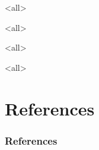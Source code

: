 \textbf{}
\begin{paracol}{2}

\begin{rightcolumn}

\begin{frame}
\titlepage
\end{frame}

\begin{frame}
\tableofcontents
\end{frame}

\newpage

\mode<all>

\mode*

\clearpage

\mode<all>

\mode*

\clearpage

\mode<all>

\mode*

\clearpage

\mode<all>

\mode*

\section{References}
\begin{frame}[allowframebreaks] \frametitle{References}
	\scriptsize
	
	
\end{frame}

\end{rightcolumn}
\end{paracol}


